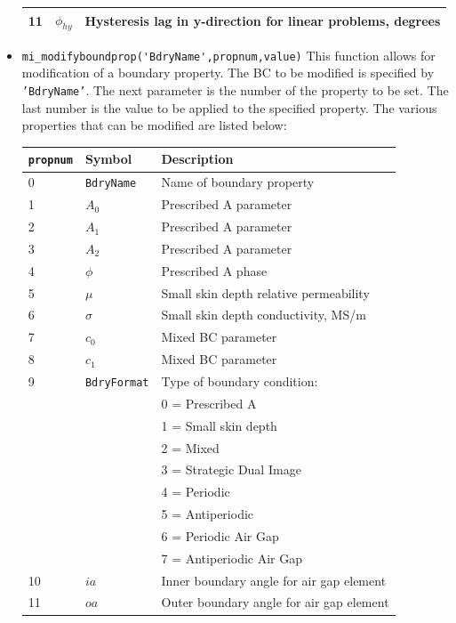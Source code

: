 \begin{itemize}
\begin{center}
\begin{tabular}{lll}
 11 & $\phi_{hy}$ & Hysteresis lag in y-direction for linear problems, degrees \\
 \hline
 \end{tabular}
 \end{center}
\item{\verb+mi_modifyboundprop('BdryName',propnum,value)+}
This function allows for modification of a boundary property. The
BC to be modified is specified by {\tt 'BdryName'}.  The next
parameter is the number of the property to be set. The last number
is the value to be applied to the specified property.  The various
properties that can be modified are listed below:
\begin{center}
\begin{tabular}{lll} \hline
{\tt propnum}& Symbol & Description \\ \hline
 0 & {\tt BdryName} & Name of boundary property \\
 1 & $A_0$ & Prescribed A parameter \\
 2 & $A_1$ & Prescribed A parameter \\
 3 & $A_2$ & Prescribed A parameter \\
 4 & $\phi$ & Prescribed A phase \\
 5 & $\mu$ & Small skin depth relative permeability \\
 6 & $\sigma$ & Small skin depth conductivity, MS/m \\
 7 & $c_0$ & Mixed BC parameter \\
 8 & $c_1$ & Mixed BC parameter \\
 9 & {\tt BdryFormat} & Type of boundary condition: \\
   &                 & 0 = Prescribed A \\
   &                 & 1 = Small skin depth \\
   &                 & 2 = Mixed \\
   &                 & 3 = Strategic Dual Image \\
   &                 & 4 = Periodic \\
   &                 & 5 = Antiperiodic \\ 
   &                 & 6 = Periodic Air Gap \\ 
   &                 & 7 = Antiperiodic Air Gap \\ 
10 & $ia$ &  Inner boundary angle for air gap element \\
11 & $oa$ & Outer boundary angle for air gap element \\ \hline
\end{tabular}

\end{center}
\end{itemize}
